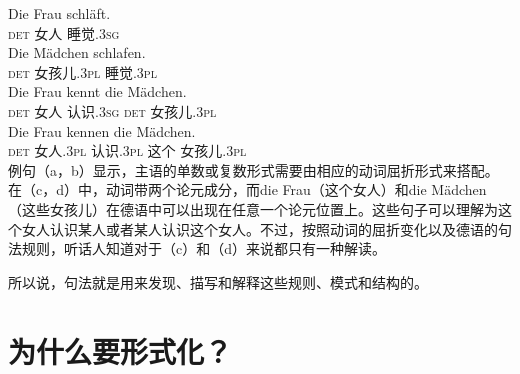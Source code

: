 \eal
\label{Beispiel-mit-Kongruenz}
\ex 
\gll Die Frau schläft.\\
     \textsc{det} 女人 睡觉.\textsc{3sg}\\
\ex 
\gll Die Mädchen schlafen.\\
     \textsc{det} 女孩儿.\textsc{3pl} 睡觉.\textsc{3pl}\\
\ex 
\gll Die Frau kennt die Mädchen.\\
     \textsc{det} 女人 认识.\textsc{3sg} \textsc{det} 女孩儿.\textsc{3pl}\\
\ex 
\gll Die Frau kennen die Mädchen.\\
     \textsc{det} 女人.\textsc{3pl} 认识.\textsc{3pl} 这个 女孩儿.\textsc{3pl}\\
\zl
例句（a，b）显示，主语的单数或复数形式需要由相应的动词屈折形式来搭配。在（c，d）中，动词带两个论元成分，而die Frau（这个女人）和die Mädchen（这些女孩儿）在德语中可以出现在任意一个论元位置上。这些句子可以理解为这个女人认识某人或者某人认识这个女人。不过，按照动词的屈折变化以及德语的句法规则，听话人知道对于（c）和（d）来说都只有一种解读。
 
所以说，句法就是用来发现、描写和解释这些规则、模式和结构的。

\section{为什么要形式化？}
\label{sec-formal}

